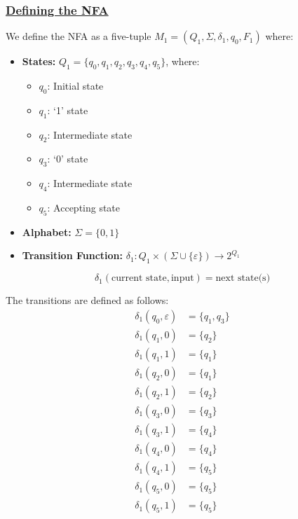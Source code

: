 \documentclass[12pt]{article}
\begin{document}
	\subsubsection*{\underline{Defining the NFA}}
	We define the NFA as a five-tuple \(M_1 = (Q_1, \Sigma, \delta_1, q_0, F_1)\) where:
	\begin{itemize}[leftmargin=*]
		\item \textbf{States:} \(Q_1 = \{q_0, q_1, q_2, q_3, q_4, q_5\}\), where:
		\begin{itemize}
			\item \(q_0\): Initial state
			\item \(q_1\): `1' state
			\item \(q_2\): Intermediate state
			\item \(q_3\): `0' state
			\item \(q_4\): Intermediate state
			\item \(q_5\): Accepting state
		\end{itemize}
		\item \textbf{Alphabet:} \(\Sigma = \{0, 1\}\)
		\item \textbf{Transition Function:} \(\delta_1: Q_1 \times (\Sigma \cup \{\varepsilon\}) \to 2^{Q_1}\)
	\end{itemize}
	
	\begin{mdframed}[linewidth=1pt, leftmargin=3cm, rightmargin=3.2cm]
		\[\delta_1(\text{current state}, \text{input}) = \text{next state(s)}\]
	\end{mdframed}
	
	The transitions are defined as follows:
	\begin{align*}
		\delta_1(q_0, \varepsilon) &= \{q_1, q_3\} \\
		\delta_1(q_1, 0) &= \{q_2\} \\
		\delta_1(q_1, 1) &= \{q_1\} \\
		\delta_1(q_2, 0) &= \{q_1\} \\
		\delta_1(q_2, 1) &= \{q_2\} \\
		\delta_1(q_3, 0) &= \{q_3\} \\
		\delta_1(q_3, 1) &= \{q_4\} \\
		\delta_1(q_4, 0) &= \{q_4\} \\
		\delta_1(q_4, 1) &= \{q_5\} \\
		\delta_1(q_5, 0) &= \{q_5\} \\
		\delta_1(q_5, 1) &= \{q_5\}
	\end{align*}
	
\end{document}
